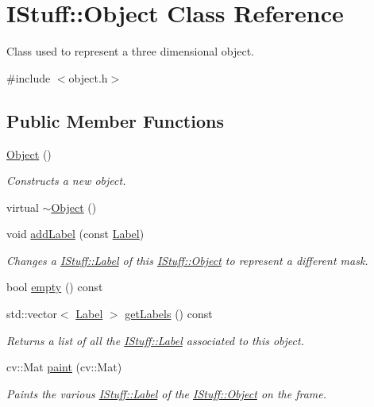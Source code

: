 \hypertarget{class_i_stuff_1_1_object}{\section{I\-Stuff\-:\-:Object Class Reference}
\label{class_i_stuff_1_1_object}
}


Class used to represent a three dimensional object.  




{\ttfamily \#include $<$object.\-h$>$}

\subsection*{Public Member Functions}
\begin{DoxyCompactItemize}
\item 
\hyperlink{class_i_stuff_1_1_object_a40860402e64d8008fb42329df7097cdb}{Object} ()
\begin{DoxyCompactList}\small\item\em Constructs a new object. \end{DoxyCompactList}\item 
virtual \hyperlink{class_i_stuff_1_1_object_ae8f5483f459e46687bd01e6f9977afd3}{$\sim$\-Object} ()
\item 
void \hyperlink{class_i_stuff_1_1_object_a67517bff1db601889fb6afbcd60ea17f}{add\-Label} (const \hyperlink{struct_i_stuff_1_1_label}{Label})
\begin{DoxyCompactList}\small\item\em Changes a \hyperlink{struct_i_stuff_1_1_label}{I\-Stuff\-::\-Label} of this \hyperlink{class_i_stuff_1_1_object}{I\-Stuff\-::\-Object} to represent a different mask. \end{DoxyCompactList}\item 
bool \hyperlink{class_i_stuff_1_1_object_aba86e2335f3c2b2db9be38c188bf04e4}{empty} () const 
\item 
std\-::vector$<$ \hyperlink{struct_i_stuff_1_1_label}{Label} $>$ \hyperlink{class_i_stuff_1_1_object_a0667b5d7d5242bfb0489f299074d2d8e}{get\-Labels} () const 
\begin{DoxyCompactList}\small\item\em Returns a list of all the \hyperlink{struct_i_stuff_1_1_label}{I\-Stuff\-::\-Label} associated to this object. \end{DoxyCompactList}\item 
cv\-::\-Mat \hyperlink{class_i_stuff_1_1_object_ac2a5f59638ed098379b07e7e8e3975cb}{paint} (cv\-::\-Mat)
\begin{DoxyCompactList}\small\item\em Paints the various \hyperlink{struct_i_stuff_1_1_label}{I\-Stuff\-::\-Label} of the \hyperlink{class_i_stuff_1_1_object}{I\-Stuff\-::\-Object} on the frame. \end{DoxyCompactList}\end{DoxyCompactItemize}
